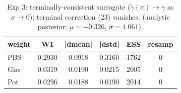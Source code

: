 \begin{table}[ht]
\centering
\caption{Exp 3: terminally-consistent surrogate ($\tilde\gamma(\sigma)\to\gamma$ as $\sigma\to 0$); terminal correction (23) vanishes. (analytic posterior: $\mu=-0.326$, $\sigma=1.061$).}
\label{tab:toy_3}
\begin{tabular}{lccccc}
\toprule
weight & W1 & |dmean| & |dstd| & ESS & resamp \\
\midrule
PBS & 0.2930 & 0.0918 & 0.3160 & 1762 & 0 \\
Girs & 0.0319 & 0.0190 & 0.0215 & 2005 & 0 \\
Pot & 0.0296 & 0.0188 & 0.0190 & 2014 & 0 \\
\bottomrule
\end{tabular}
\end{table}
